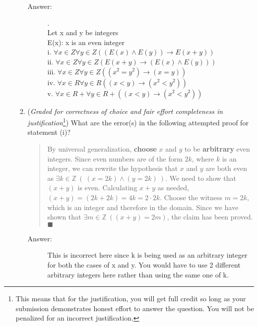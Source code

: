 \documentclass[12pt, oneside]{article}
\begin{document}
\begin{enumerate}
\begin{enumerate}
\begin{description}
    \item[Answer:] .\\
    Let x and y be integers\\
    E(x): x is an even integer\\
    i. $\forall x \in Z \forall y \in Z((E(x) \land E(y)) \rightarrow E(x+y))$\\
    ii. $\forall x \in Z \forall y \in Z(E(x+y) \rightarrow (E(x) \land E(y)))$\\
    iii. $\forall x \in Z \forall y \in Z((x^2 = y^2)  \rightarrow (x = y))$\\
    iv. $\forall x \in R \forall y \in R((x < y)  \rightarrow (x^2 < y^2))$\\
    v. $\forall x \in R+ \forall y \in R+((x < y)  \rightarrow (x^2 < y^2))$\\

\end{description}

\item ({\it Graded for correctness of choice and fair effort completeness in justification}\footnote{This means that for the justification, you will get full credit so long as your submission 
demonstrates honest effort to answer the question. You will not be penalized for an incorrect justification.}) What are the error(s) in the following attempted proof for statement (i)?

\begin{quote}
  By universal generalization, {\bf choose} $x$ and $y$ to be {\bf arbitrary} even integers. 
  Since even numbers are of the form $2k$, where $k$ is an integer, we can rewrite the hypothesis that $x$ and $y$ are both even as $\exists k \in \mathbb{Z}~(~(x = 2k) \land (y= 2k)~)$. We need to show that $(x + y)$ is even. 
  Calculating $x+y$ as needed, 
  $(x+y) = (2k + 2k) = 4k = 2 \cdot 2k$. Choose the witness $m = 2k$, which is an integer and therefore in the domain. Since we have shown that $\exists m \in \mathbb{Z}~( (x+y) = 2m)$, the claim has been proved. \hfill{$\blacksquare$}
\end{quote}

\begin{description}
    \item[Answer:] This is incorrect here since k is being used as an arbitrary integer for both the cases of x and y. You would have to use 2 different arbitrary integers here rather than using the same one of k.
\end{description}


\end{enumerate}
\end{enumerate}
\end{document}
